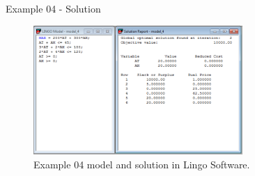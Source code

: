 \begin{frame}{Example 04 - Solution}
\begin{figure}
    \includegraphics[width=300px]{slides/ex04/screenshot.png}
    \caption{Example 04 model and solution in Lingo Software.}
\end{figure}
\end{frame}
